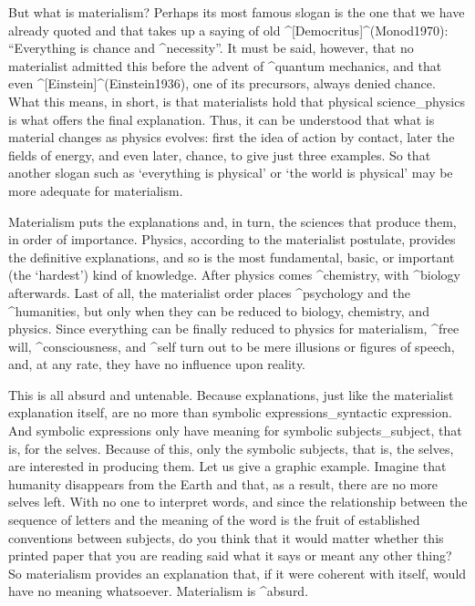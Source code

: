 But what is materialism?  Perhaps its most famous slogan is the one that
we have already quoted and that takes up a saying of old
^[Democritus]^(Monod1970): ``Everything is chance and ^{necessity}''. It
must be said, however, that no materialist admitted this before the
advent of ^{quantum mechanics}, and that even
^[Einstein]^(Einstein1936), one of its precursors, always denied chance.
What this means, in short, is that materialists hold that physical
science_{physics} is what offers the final explanation. Thus, it can be
understood that what is material changes as physics evolves: first the
idea of action by contact, later the fields of energy, and even later,
chance, to give just three examples. So that another slogan such as
`everything is physical' or `the world is physical' may be more adequate
for materialism.

Materialism puts the explanations and, in turn, the sciences that
produce them, in order of importance. Physics, according to the
materialist postulate, provides the definitive explanations, and so is
the most fundamental, basic, or important (the `hardest') kind of
knowledge. After physics comes ^{chemistry}, with ^{biology} afterwards.
Last of all, the materialist order places ^{psychology} and the
^{humanities}, but only when they can be reduced to biology, chemistry,
and physics. Since everything can be finally reduced to physics for
materialism, ^{free will}, ^{consciousness}, and ^{self} turn out to be
mere illusions or figures of speech, and, at any rate, they have no
influence upon reality.

This is all absurd and untenable. Because explanations, just like the
materialist explanation itself, are no more than symbolic
expressions_{syntactic expression}. And symbolic expressions only have
meaning for symbolic subjects_{subject}, that is, for the selves.
Because of this, only the symbolic subjects, that is, the selves, are
interested in producing them. Let us give a graphic example. Imagine
that humanity disappears from the Earth and that, as a result, there are
no more selves left. With no one to interpret words, and since the
relationship between the sequence of letters and the meaning of the word
is the fruit of established conventions between subjects, do you think
that it would matter whether this printed paper that you are reading
said what it says or meant any other thing?  So materialism provides an
explanation that, if it were coherent with itself, would have no meaning
whatsoever. Materialism is ^{absurd}.

